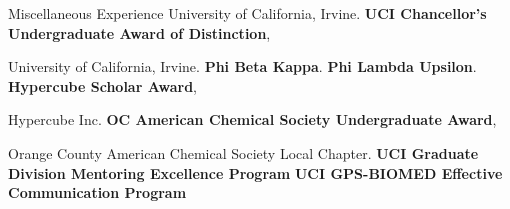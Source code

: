 \begin{rubric}{Miscellaneous Experience}
University of California, Irvine.
%
\entry*[Jun 2015] \textbf{UCI Chancellor's Undergraduate Award of Distinction},

University of California, Irvine.
%
\entry*[May 2015] \textbf{Phi Beta Kappa}.
%
\entry*[May 2015] \textbf{Phi Lambda Upsilon}.
%
\entry*[Jun 2014] \textbf{Hypercube Scholar Award},

Hypercube Inc.
%
\entry*[Apr 2014] \textbf{OC American Chemical Society Undergraduate Award},

Orange County American Chemical Society Local Chapter.
%
\entry*[Mar 2020] \textbf{UCI Graduate Division Mentoring Excellence Program}
%
\entry*[Jun 2017] \textbf{UCI GPS-BIOMED Effective Communication Program} 
\end{rubric}

